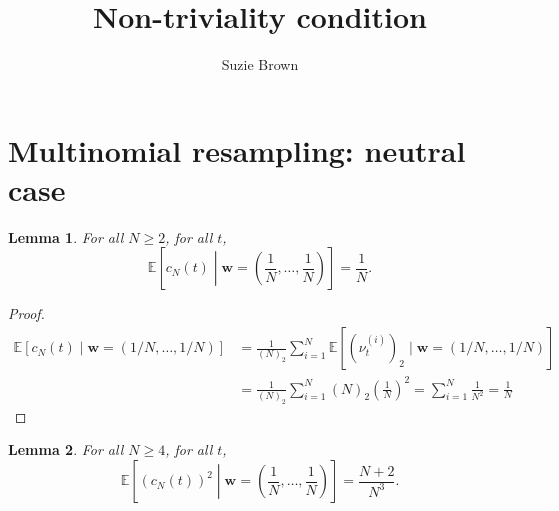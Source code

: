 \documentclass{article}
\title{Non-triviality condition}
\author{Suzie Brown}
\newtheorem{lemma}{Lemma}
\newcommand{\E}{\mathbb{E}}
\begin{document}
\maketitle
\thispagestyle{fancy}

\section*{Multinomial resampling: neutral case}

\begin{lemma}
For all $N\geq 2$, for all $t$,
\begin{equation*}
\E \left[c_N(t) \middle| \mathbf{w}=\left( \frac{1}{N}, \dots, \frac{1}{N} \right) \right]
= \frac{1}{N} .
\end{equation*}
\end{lemma}

\begin{proof}
\begin{align*}
\E \left[c_N(t) \middle| \mathbf{w}=(1/N,\dots,1/N) \right]
&= \frac{1}{(N)_2} \sum_{i=1}^N \E \left[(\nu_t^{(i)})_2 \mid \mathbf{w}=(1/N,\dots,1/N) \right] \\
&= \frac{1}{(N)_2} \sum_{i=1}^N (N)_2 \left(\frac{1}{N}\right)^2
=  \sum_{i=1}^N \frac{1}{N^2}
= \frac{1}{N}
\end{align*}
\end{proof}

\begin{lemma}
For all $N\geq 4$, for all $t$,
\begin{equation*}
\E \left[(c_N(t))^2 \middle| \mathbf{w}=\left( \frac{1}{N}, \dots, \frac{1}{N} \right) \right]
= \frac{N+2}{N^3} .
\end{equation*}
\end{lemma}
\end{document}
